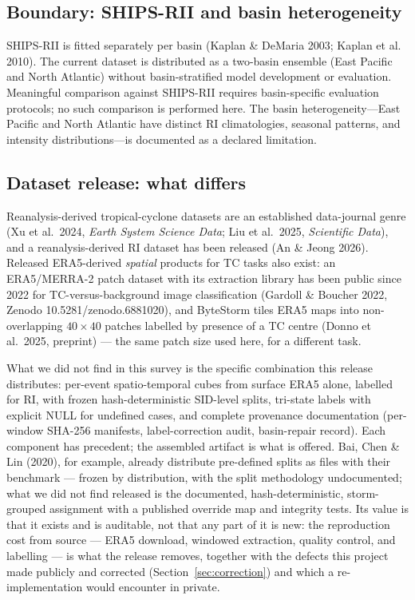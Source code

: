 \documentclass[11pt]{article}
\begin{document}
\subsection{Boundary: SHIPS-RII and basin heterogeneity}

SHIPS-RII is fitted separately per basin (Kaplan \& DeMaria 2003; Kaplan et
al. 2010). The current dataset is distributed as a two-basin ensemble (East
Pacific and North Atlantic) without basin-stratified model development or
evaluation. Meaningful comparison against SHIPS-RII requires basin-specific
evaluation protocols; no such comparison is performed here. The basin
heterogeneity---East Pacific and North Atlantic have distinct RI
climatologies, seasonal patterns, and intensity distributions---is
documented as a declared limitation.

\subsection{Dataset release: what differs}

Reanalysis-derived tropical-cyclone datasets are an established data-journal
genre (Xu et al.\ 2024, \emph{Earth System Science Data}; Liu et al.\ 2025,
\emph{Scientific Data}), and a reanalysis-derived RI dataset has been released
(An \& Jeong 2026). Released ERA5-derived \emph{spatial} products for TC tasks
also exist: an ERA5/MERRA-2 patch dataset with its extraction library has been
public since 2022 for TC-versus-background image classification
(Gardoll \& Boucher 2022, Zenodo 10.5281/zenodo.6881020), and ByteStorm
tiles ERA5 maps into non-overlapping $40\times40$ patches labelled by presence
of a TC centre (Donno et al.\ 2025, preprint) --- the same patch size
used here, for a different task.

What we did not find in this survey is the specific combination this release
distributes: per-event spatio-temporal cubes from surface ERA5 alone, labelled
for RI, with frozen hash-deterministic SID-level splits, tri-state labels with
explicit NULL for undefined cases, and complete provenance documentation
(per-window SHA-256 manifests, label-correction audit, basin-repair record).
Each component has precedent; the assembled artifact is what is offered.
Bai, Chen \& Lin (2020), for example, already distribute pre-defined splits
as files with their benchmark --- frozen by distribution, with the split
methodology undocumented; what we did not find released is the documented,
hash-deterministic, storm-grouped assignment with a published override map
and integrity tests. Its
value is that it exists and is auditable, not that any part of it is new: the
reproduction cost from source --- ERA5 download, windowed extraction, quality
control, and labelling --- is what the release removes, together with the
defects this project made publicly and corrected (Section~\ref{sec:correction})
and which a re-implementation would encounter in private.
\end{document}

